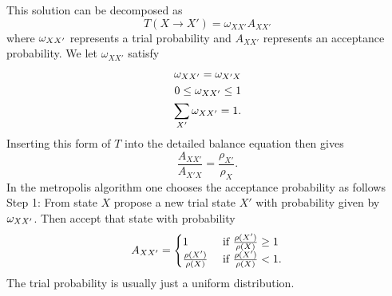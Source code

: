 This solution can be decomposed as
\begin{equation}
  T(X\rightarrow X') = \omega_{XX'} A_{XX'}
\end{equation}
where $\omega_{XX'}$ represents a trial probability and $A_{XX'}$ represents an acceptance probability.
We let $\omega_{XX'}$ satisfy
\begin{align}
  \omega_{XX'} = \omega_{X'X}\\
  0 \leq \omega_{XX'} \leq 1\\
  \sum_{X'} \omega_{XX'} = 1.
\end{align}
Inserting this form of $T$ into the detailed balance equation then gives
\begin{equation}
  \frac{A_{XX'}}{A_{X'X}} = \frac{\rho_{X'}}{\rho_{X}}.
\end{equation}
In the metropolis algorithm one chooses the acceptance probability as follows
Step 1: From state $X$ propose a new trial state $X'$ with probability given by $\omega_{XX'}$. Then accept that state with probability 
\begin{equation}
  A_{XX'} = 
  \begin{cases}
    	1 &\textrm{ if } \frac{\rho(X')}{\rho(X)} \geq 1\\
	\frac{\rho(X')}{\rho(X)}&\textrm{ if } \frac{\rho(X')}{\rho(X)} < 1 .
  \end{cases}
\end{equation}
The trial probability is usually just a uniform distribution.
